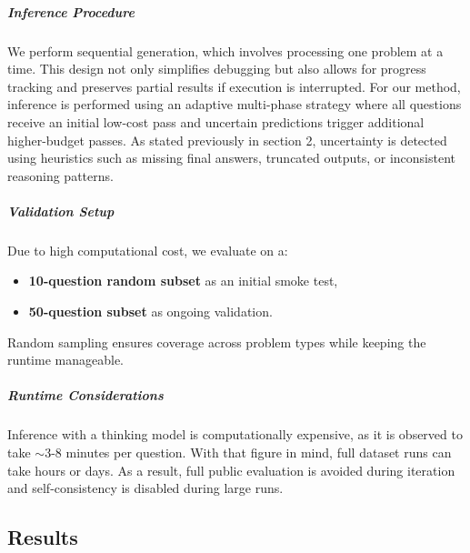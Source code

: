 \documentclass{article}
\begin{document}
\subparagraph{Inference Procedure} We perform sequential generation, which involves processing one problem at a time. This design not only simplifies debugging but also allows for progress tracking and preserves partial results if execution is interrupted. For our method, inference is performed using an adaptive multi-phase strategy where all questions receive an initial low-cost pass and uncertain predictions trigger additional higher-budget passes. As stated previously in section 2, uncertainty is detected using heuristics such as missing final answers, truncated outputs, or inconsistent reasoning patterns.
\subparagraph{Validation Setup} Due to high computational cost, we evaluate on a:
\begin{itemize}
    \item \textbf{10-question random subset} as an initial smoke test,
    \item \textbf{50-question subset} as ongoing validation.
\end{itemize}

Random sampling ensures coverage across problem types while keeping the runtime manageable.

\subparagraph{Runtime Considerations} Inference with a thinking model is computationally expensive, as it is observed to take $\sim$3-8 minutes per question. With that figure in mind, full dataset runs can take hours or days. As a result, full public evaluation is avoided during iteration and self-consistency is disabled during large runs.
% 
\subsection{Results}
\label{sec:results}
\end{document}
